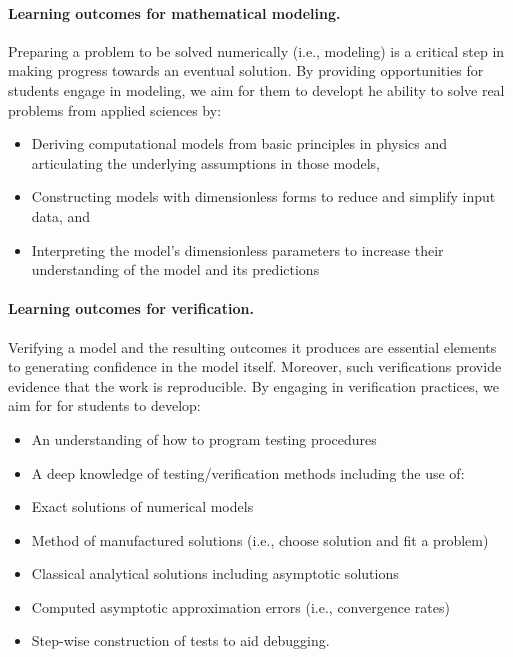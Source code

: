 \noindent
\paragraph{Learning outcomes for mathematical modeling.}
Preparing a problem to be solved numerically (i.e., modeling) is a critical step in making progress towards an eventual solution. By providing opportunities for students engage in modeling, we aim for them to developt he ability to solve real problems from applied sciences by:

\begin{itemize}
\item Deriving computational models from basic principles in physics and articulating the underlying assumptions in those models,

\item Constructing models with dimensionless forms to reduce and simplify input data, and

\item Interpreting the model's dimensionless parameters to increase their understanding of the model and its predictions
\end{itemize}

\noindent
\paragraph{Learning outcomes for verification.}
Verifying a model and the resulting outcomes it produces are essential elements to generating confidence in the model itself. Moreover, such verifications provide evidence that the work is reproducible. By engaging in verification practices, we aim for for students to develop:

\begin{itemize}
\item An understanding of how to program testing procedures

\item A deep knowledge of testing/verification methods including the use of:

\item Exact solutions of numerical models

\item Method of manufactured solutions (i.e., choose solution and fit a problem)

\item Classical analytical solutions including asymptotic solutions

\item Computed asymptotic approximation errors (i.e., convergence rates)

\item Step-wise construction of tests to aid debugging.
\end{itemize}

